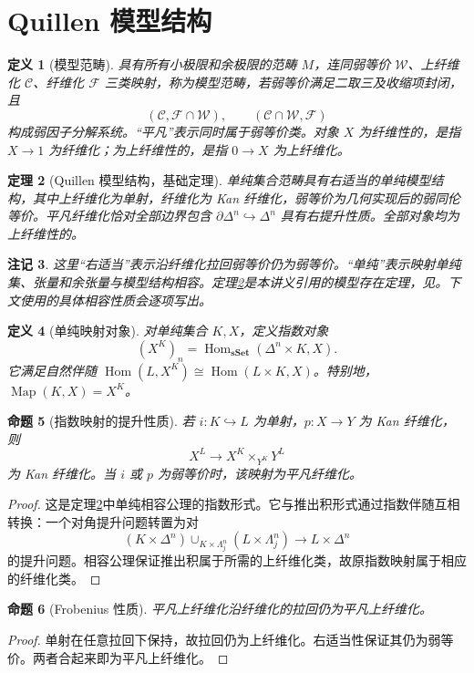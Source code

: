 \documentclass[12pt,oneside,openany,fontset=none]{ctexbook}
\theoremstyle{cn}
\newtheorem{definition}{定义}[chapter]
\newtheorem{proposition}[definition]{命题}
\newtheorem{theorem}[definition]{定理}
\newtheorem{remark}[definition]{注记}
\numberwithin{equation}{chapter}
\newcommand{\sSet}{\mathbf{sSet}}
\newcommand{\Hom}{\operatorname{Hom}}
\newcommand{\Map}{\operatorname{Map}}
\begin{document}
\section{Quillen 模型结构}
\begin{definition}[模型范畴]
具有所有小极限和余极限的范畴 $M$，连同弱等价 $\mathcal W$、上纤维化 $\mathcal C$、纤维化 $\mathcal F$ 三类映射，称为模型范畴，若弱等价满足二取三及收缩项封闭，且
\[
(\mathcal C,\mathcal F\cap\mathcal W),
\qquad(\mathcal C\cap\mathcal W,\mathcal F)
\]
构成弱因子分解系统。“平凡”表示同时属于弱等价类。对象 $X$ 为纤维性的，是指 $X\to1$ 为纤维化；为上纤维性的，是指 $0\to X$ 为上纤维化。
\end{definition}
\begin{theorem}[Quillen 模型结构，基础定理]\label{thm:quillen}
单纯集合范畴具有右适当的单纯模型结构，其中上纤维化为单射，纤维化为 Kan 纤维化，弱等价为几何实现后的弱同伦等价。平凡纤维化恰对全部边界包含 $\partial\Delta^n\hookrightarrow\Delta^n$ 具有右提升性质。全部对象均为上纤维性的。
\end{theorem}
\begin{remark}
这里“右适当”表示沿纤维化拉回弱等价仍为弱等价。“单纯”表示映射单纯集、张量和余张量与模型结构相容。定理\ref{thm:quillen}是本讲义引用的模型存在定理，见\cite{Quillen,GoerssJardine}。下文使用的具体相容性质会逐项写出。
\end{remark}
\begin{definition}[单纯映射对象]
对单纯集合 $K,X$，定义指数对象
\[
(X^K)_n=\Hom_{\sSet}(\Delta^n\times K,X).
\]
它满足自然伴随 $\Hom(L,X^K)\cong\Hom(L\times K,X)$。特别地，$\Map(K,X)=X^K$。
\end{definition}
\begin{proposition}[指数映射的提升性质]\label{prop:SM7}
若 $i:K\hookrightarrow L$ 为单射，$p:X\to Y$ 为 Kan 纤维化，则
\[
X^L\longrightarrow X^K\times_{Y^K}Y^L
\]
为 Kan 纤维化。当 $i$ 或 $p$ 为弱等价时，该映射为平凡纤维化。
\end{proposition}
\begin{proof}
这是定理\ref{thm:quillen}中单纯相容公理的指数形式。它与推出积形式通过指数伴随互相转换：一个对角提升问题转置为对
\[
(K\times\Delta^n)\cup_{K\times\Lambda_j^n}(L\times\Lambda_j^n)
\longrightarrow L\times\Delta^n
\]
的提升问题。相容公理保证推出积属于所需的上纤维化类，故原指数映射属于相应的纤维化类。
\end{proof}
\begin{proposition}[Frobenius 性质]
平凡上纤维化沿纤维化的拉回仍为平凡上纤维化。
\end{proposition}
\begin{proof}
单射在任意拉回下保持，故拉回仍为上纤维化。右适当性保证其仍为弱等价。两者合起来即为平凡上纤维化。
\end{proof}
\end{document}
